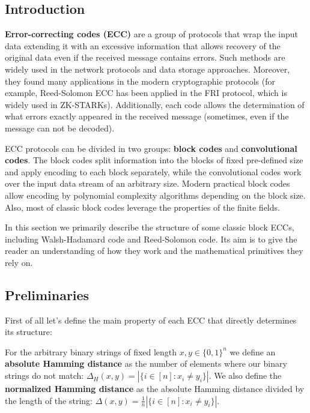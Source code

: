 \documentclass[../lecture-notes-148x210.tex]{subfiles}
\begin{document}
\subsection{Introduction}
\textbf{Error-correcting codes (ECC)} are a group of protocols that wrap the
input data extending it with an excessive information that allows recovery of
the original data even if the received message contains errors. Such methods are
widely used in the network protocols and data storage approaches. Moreover, they
found many applications in the modern cryptographic protocols (for example,
Reed-Solomon ECC has been applied in the FRI protocol, which is widely used in
ZK-STARKs). Additionally, each code allows the determination of what errors
exactly appeared in the received message (sometimes, even if the message can not
be decoded).

ECC protocols can be divided in two groups: \textbf{block codes} and
\textbf{convolutional codes}. The block codes split information into the blocks
of fixed pre-defined size and apply encoding to each block separately, while the
convolutional codes work over the input data stream of an arbitrary size. Modern
practical block codes allow encoding by polynomial complexity algorithms
depending on the block size. Also, most of classic block codes leverage the
properties of the finite fields.

In this section we primarily describe the structure of some classic block ECCs,
including Walsh-Hadamard code and Reed-Solomon code. Its aim is to give the
reader an understanding of how they work and the mathematical primitives they
rely on.

\subsection{Preliminaries}

First of all let's define the main property of each ECC that directly determines its structure:
\begin{definition}
For the arbitrary binary strings of fixed length $x, y \in \{0, 1\}^n$ we define
an \textbf{absolute Hamming distance} as the number of elements where our binary
strings do not match: $\Delta_H(x,y) = \left|\{i \in [n]: x_i \neq y_i\}\right|$. We also
define the \textbf{normalized Hamming distance} as the absolute Hamming distance
divided by the length of the string: $\Delta(x,y) = \frac{1}{n}\left|\{i \in [n]: x_i
\neq y_i\}\right|$.
\end{definition}
\end{document}
